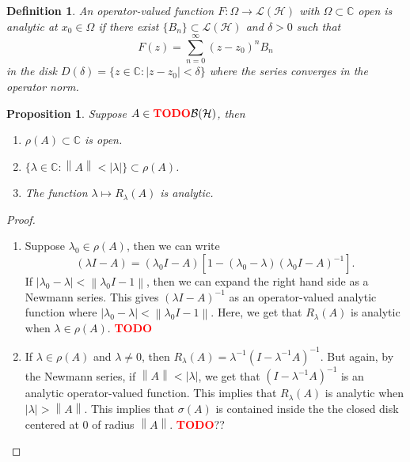 \documentclass{article}
\newtheorem*{proposition}{Proposition}
\newtheorem*{definition}{Definition}
\newcommand{\C}{\mathbb{C}}
\newcommand{\B}{\mathcal{B}}
\renewcommand{\H}{\mathcal{H}}
\renewcommand{\L}{\mathcal{L}}
\newcommand{\norm}[1]{\left\lVert#1 \right\rVert}
\newcommand{\td}{\textcolor{red}{\textbf{TODO}}}
\begin{document}
\begin{definition}
    An operator-valued function $F : \Omega \to \L(\H)$ with $\Omega \subset \C$ open is analytic at $x_0 \in \Omega$ if there exist $\{B_n\} \subset \L(\H)$ and $\delta > 0$ such that 
    $$F(z) = \sum_{n=0}^{\infty}(z - z_0)^n B_n$$
    in the disk $D(\delta) = \{z \in \C : |z - z_0| < \delta\}$ where the series converges in the operator norm.
\end{definition}

\begin{proposition}
    Suppose $A \in \td \B(\H)$, then
    \begin{enumerate}
        \item $\rho(A) \subset \C$ is open.
        \item $\{\lambda \in \C : \norm{A} < |\lambda|\} \subset \rho(A)$.
        \item The function $\lambda \mapsto R_{\lambda}(A)$ is analytic.
    \end{enumerate}
\end{proposition}

\begin{proof}
    \begin{enumerate}
        \item Suppose $\lambda_0 \in \rho(A)$, then we can write 
        $$(\lambda I - A) = (\lambda_0 I - A)[1 - (\lambda_0 - \lambda)(\lambda_0 I - A)^{-1}].$$
        If $|\lambda_0 - \lambda| < \norm{\lambda_0 I - 1}$, then we can expand the right hand side as a Newmann series. This gives $(\lambda I - A)^{-1}$ as an operator-valued analytic function where $|\lambda_0 - \lambda| < \norm{\lambda_0 I - 1}$. Here, we get that $R_{\lambda}(A)$ is analytic when $\lambda \in \rho(A)$. \td
        \item If $\lambda \in \rho(A)$ and $\lambda \neq 0$, then $R_{\lambda}(A) = \lambda^{-1}(I - \lambda^{-1}A)^{-1}$. But again, by the Newmann series, if $\norm{A} < |\lambda|$, we get that $(I - \lambda^{-1}A)^{-1}$ is an analytic operator-valued function. This implies that $R_{\lambda}(A)$ is analytic when $|\lambda| > \norm{A}$. This implies that $\sigma(A)$ is contained inside the the closed disk centered at 0 of radius $\norm{A}$. \td ??
    \end{enumerate}
\end{proof}
\end{document}
